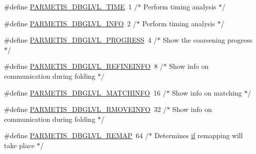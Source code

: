 \begin{DoxyCompactItemize}
\item 
\#define \hyperlink{3rd_party_2parmetis-4_80_83_2include_2parmetis_8h_a83335527ec28434827ba22669c20f519}{P\+A\+R\+M\+E\+T\+I\+S\+\_\+\+D\+B\+G\+L\+V\+L\+\_\+\+T\+I\+ME}~1      /$\ast$ Perform timing analysis $\ast$/
\item 
\#define \hyperlink{3rd_party_2parmetis-4_80_83_2include_2parmetis_8h_ad4d113bb626ca386dfbb86d6730c9d0d}{P\+A\+R\+M\+E\+T\+I\+S\+\_\+\+D\+B\+G\+L\+V\+L\+\_\+\+I\+N\+FO}~2      /$\ast$ Perform timing analysis $\ast$/
\item 
\#define \hyperlink{3rd_party_2parmetis-4_80_83_2include_2parmetis_8h_a6913cca439f729f0d831646979505f71}{P\+A\+R\+M\+E\+T\+I\+S\+\_\+\+D\+B\+G\+L\+V\+L\+\_\+\+P\+R\+O\+G\+R\+E\+SS}~4      /$\ast$ Show the coarsening progress $\ast$/
\item 
\#define \hyperlink{3rd_party_2parmetis-4_80_83_2include_2parmetis_8h_a483143525f038b8d1cc9876e104b2228}{P\+A\+R\+M\+E\+T\+I\+S\+\_\+\+D\+B\+G\+L\+V\+L\+\_\+\+R\+E\+F\+I\+N\+E\+I\+N\+FO}~8      /$\ast$ Show info on communication during folding $\ast$/
\item 
\#define \hyperlink{3rd_party_2parmetis-4_80_83_2include_2parmetis_8h_a2c17217243390b94295386f8cb1f853d}{P\+A\+R\+M\+E\+T\+I\+S\+\_\+\+D\+B\+G\+L\+V\+L\+\_\+\+M\+A\+T\+C\+H\+I\+N\+FO}~16     /$\ast$ Show info on matching $\ast$/
\item 
\#define \hyperlink{3rd_party_2parmetis-4_80_83_2include_2parmetis_8h_aff381af99e792c5a07a391f18bc1a6ea}{P\+A\+R\+M\+E\+T\+I\+S\+\_\+\+D\+B\+G\+L\+V\+L\+\_\+\+R\+M\+O\+V\+E\+I\+N\+FO}~32     /$\ast$ Show info on communication during folding $\ast$/
\item 
\#define \hyperlink{3rd_party_2parmetis-4_80_83_2include_2parmetis_8h_a38aa880d4f8c0dbda1800f21f606a1e1}{P\+A\+R\+M\+E\+T\+I\+S\+\_\+\+D\+B\+G\+L\+V\+L\+\_\+\+R\+E\+M\+AP}~64     /$\ast$ Determines \hyperlink{threed__to__vtu_8m_a96c738d3e2120c4273f9d4390761d99e}{if} remapping will take place $\ast$/
\end{DoxyCompactItemize}
